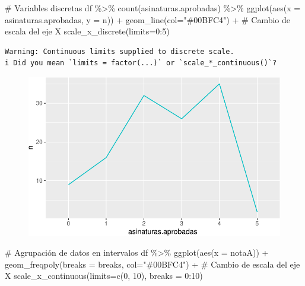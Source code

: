 \documentclass[
  a4paper,
]{scrreport}
\newenvironment{Shaded}{\begin{snugshade}}{\end{snugshade}}
\newcommand{\AttributeTok}[1]{\textcolor[rgb]{0.40,0.45,0.13}{#1}}
\newcommand{\CommentTok}[1]{\textcolor[rgb]{0.37,0.37,0.37}{#1}}
\newcommand{\DecValTok}[1]{\textcolor[rgb]{0.68,0.00,0.00}{#1}}
\newcommand{\FunctionTok}[1]{\textcolor[rgb]{0.28,0.35,0.67}{#1}}
\newcommand{\NormalTok}[1]{\textcolor[rgb]{0.00,0.23,0.31}{#1}}
\newcommand{\SpecialCharTok}[1]{\textcolor[rgb]{0.37,0.37,0.37}{#1}}
\newcommand{\StringTok}[1]{\textcolor[rgb]{0.13,0.47,0.30}{#1}}
\theoremstyle{definition}
\theoremstyle{definition}
\theoremstyle{remark}
\begin{document}
\begin{Shaded}
\begin{Highlighting}[]
\CommentTok{\# Variables discretas}
\NormalTok{df }\SpecialCharTok{\%\textgreater{}\%} \FunctionTok{count}\NormalTok{(asinaturas.aprobadas) }\SpecialCharTok{\%\textgreater{}\%}
  \FunctionTok{ggplot}\NormalTok{(}\FunctionTok{aes}\NormalTok{(}\AttributeTok{x =}\NormalTok{ asinaturas.aprobadas, }\AttributeTok{y =}\NormalTok{ n)) }\SpecialCharTok{+}
  \FunctionTok{geom\_line}\NormalTok{(}\AttributeTok{col=}\StringTok{"\#00BFC4"}\NormalTok{) }\SpecialCharTok{+} 
  \CommentTok{\# Cambio de escala del eje X}
  \FunctionTok{scale\_x\_discrete}\NormalTok{(}\AttributeTok{limits=}\DecValTok{0}\SpecialCharTok{:}\DecValTok{5}\NormalTok{) }
\end{Highlighting}
\end{Shaded}

\begin{verbatim}
Warning: Continuous limits supplied to discrete scale.
i Did you mean `limits = factor(...)` or `scale_*_continuous()`?
\end{verbatim}

\begin{figure}[H]

{\centering \includegraphics{./08-analisis-estadisticos_files/figure-pdf/unnamed-chunk-13-1.pdf}

}

\end{figure}

\begin{Shaded}
\begin{Highlighting}[]
\CommentTok{\# Agrupación de datos en intervalos}
\NormalTok{df }\SpecialCharTok{\%\textgreater{}\%} \FunctionTok{ggplot}\NormalTok{(}\FunctionTok{aes}\NormalTok{(}\AttributeTok{x =}\NormalTok{ notaA)) }\SpecialCharTok{+} 
  \FunctionTok{geom\_freqpoly}\NormalTok{(}\AttributeTok{breaks =}\NormalTok{ breaks, }\AttributeTok{col=}\StringTok{"\#00BFC4"}\NormalTok{) }\SpecialCharTok{+} 
  \CommentTok{\# Cambio de escala del eje X}
  \FunctionTok{scale\_x\_continuous}\NormalTok{(}\AttributeTok{limits=}\FunctionTok{c}\NormalTok{(}\DecValTok{0}\NormalTok{, }\DecValTok{10}\NormalTok{), }\AttributeTok{breaks =} \DecValTok{0}\SpecialCharTok{:}\DecValTok{10}\NormalTok{) }
\end{Highlighting}
\end{Shaded}
\end{document}
